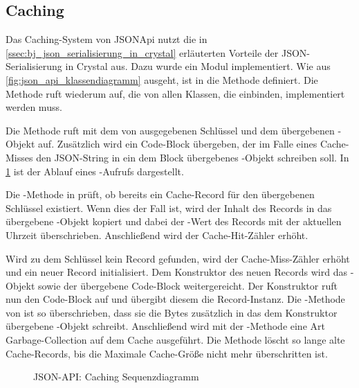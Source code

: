 \subsection{Caching}
\label{ssec:bj_caching}

Das Caching-System von JSONApi nutzt die in
\cref{ssec:bj_json_serialisierung_in_crystal} erläuterten Vorteile der
JSON-Serialisierung in Crystal aus.  Dazu wurde ein Modul 
implementiert.  Wie aus \cref{fig:json_api_klassendiagramm} ausgeht,
ist in  die Methode  definiert.  Die Methode
ruft wiederum  auf, die von allen Klassen, die
 einbinden, implementiert werden muss.

Die Methode  ruft  mit dem von 
ausgegebenen Schlüssel und dem übergebenen -Objekt auf.  Zusätzlich
wird ein Code-Block übergeben, der im Falle eines Cache-Misses den JSON-String
in ein dem Block übergebenes -Objekt schreiben soll.  In
\cref{fig:json_api_caching_sequenzdiagramm} ist der Ablauf eines
-Aufrufs dargestellt.

Die -Methode in  prüft, ob bereits ein
Cache-Record für den übergebenen Schlüssel existiert.  Wenn dies der
Fall ist, wird der Inhalt des Records in das übergebene -Objekt
kopiert und dabei der -Wert des Records mit der aktuellen
Uhrzeit überschrieben.  Anschließend wird der Cache-Hit-Zähler erhöht.

Wird zu dem Schlüssel kein Record gefunden, wird der Cache-Miss-Zähler erhöht
und ein neuer Record initialisiert.  Dem Konstruktor des neuen Records wird das
-Objekt sowie der übergebene Code-Block weitergereicht.  Der
Konstruktor ruft nun den Code-Block auf und übergibt diesem die Record-Instanz.
Die -Methode von  ist so überschrieben, dass
sie die Bytes zusätzlich in das dem Konstruktor übergebene -Objekt
schreibt.  Anschließend wird mit der -Methode eine Art
Garbage-Collection auf dem Cache ausgeführt.  Die Methode löscht so lange alte
Cache-Records, bis die Maximale Cache-Größe nicht mehr überschritten ist.

\begin{figure}
	\center
	
	\caption{JSON-API: Caching Sequenzdiagramm}
	\label{fig:json_api_caching_sequenzdiagramm}
\end{figure}
